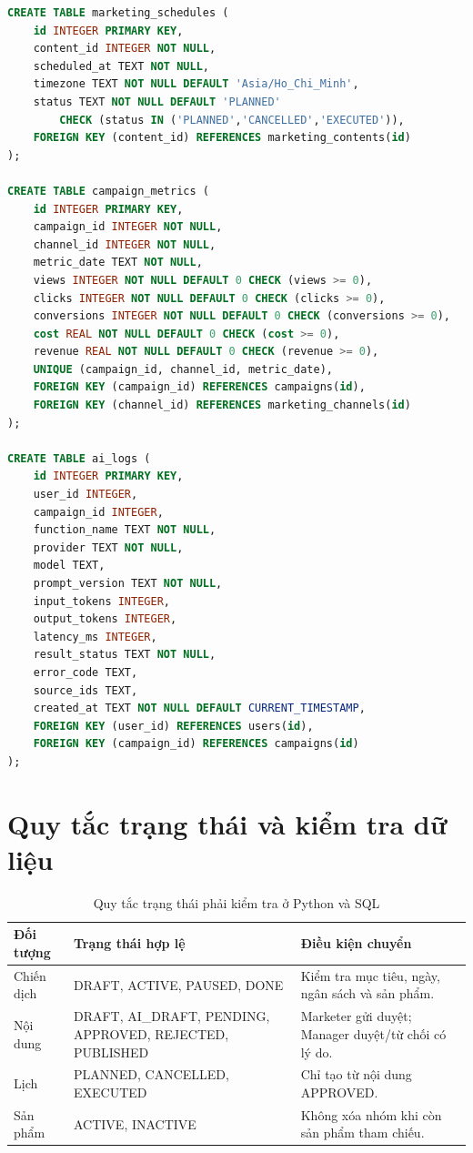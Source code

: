 \begin{lstlisting}[language=SQL,caption={DDL đầy đủ của hệ thống marketing}]
CREATE TABLE marketing_schedules (
    id INTEGER PRIMARY KEY,
    content_id INTEGER NOT NULL,
    scheduled_at TEXT NOT NULL,
    timezone TEXT NOT NULL DEFAULT 'Asia/Ho_Chi_Minh',
    status TEXT NOT NULL DEFAULT 'PLANNED'
        CHECK (status IN ('PLANNED','CANCELLED','EXECUTED')),
    FOREIGN KEY (content_id) REFERENCES marketing_contents(id)
);

CREATE TABLE campaign_metrics (
    id INTEGER PRIMARY KEY,
    campaign_id INTEGER NOT NULL,
    channel_id INTEGER NOT NULL,
    metric_date TEXT NOT NULL,
    views INTEGER NOT NULL DEFAULT 0 CHECK (views >= 0),
    clicks INTEGER NOT NULL DEFAULT 0 CHECK (clicks >= 0),
    conversions INTEGER NOT NULL DEFAULT 0 CHECK (conversions >= 0),
    cost REAL NOT NULL DEFAULT 0 CHECK (cost >= 0),
    revenue REAL NOT NULL DEFAULT 0 CHECK (revenue >= 0),
    UNIQUE (campaign_id, channel_id, metric_date),
    FOREIGN KEY (campaign_id) REFERENCES campaigns(id),
    FOREIGN KEY (channel_id) REFERENCES marketing_channels(id)
);

CREATE TABLE ai_logs (
    id INTEGER PRIMARY KEY,
    user_id INTEGER,
    campaign_id INTEGER,
    function_name TEXT NOT NULL,
    provider TEXT NOT NULL,
    model TEXT,
    prompt_version TEXT NOT NULL,
    input_tokens INTEGER,
    output_tokens INTEGER,
    latency_ms INTEGER,
    result_status TEXT NOT NULL,
    error_code TEXT,
    source_ids TEXT,
    created_at TEXT NOT NULL DEFAULT CURRENT_TIMESTAMP,
    FOREIGN KEY (user_id) REFERENCES users(id),
    FOREIGN KEY (campaign_id) REFERENCES campaigns(id)
);
\end{lstlisting}

\section{Quy tắc trạng thái và kiểm tra dữ liệu}

\begin{table}[h!]
\centering
\small
\caption{Quy tắc trạng thái phải kiểm tra ở Python và SQL}
\begin{tabularx}{\textwidth}{|L{3.2cm}|Y|Y|}
\hline
\textbf{Đối tượng} & \textbf{Trạng thái hợp lệ} & \textbf{Điều kiện chuyển}\\\hline
Chiến dịch & DRAFT, ACTIVE, PAUSED, DONE & Kiểm tra mục tiêu, ngày, ngân sách và sản phẩm.\\\hline
Nội dung & DRAFT, AI\_DRAFT, PENDING, APPROVED, REJECTED, PUBLISHED & Marketer gửi duyệt; Manager duyệt/từ chối có lý do.\\\hline
Lịch & PLANNED, CANCELLED, EXECUTED & Chỉ tạo từ nội dung APPROVED.\\\hline
Sản phẩm & ACTIVE, INACTIVE & Không xóa nhóm khi còn sản phẩm tham chiếu.\\\hline
\end{tabularx}
\end{table}

